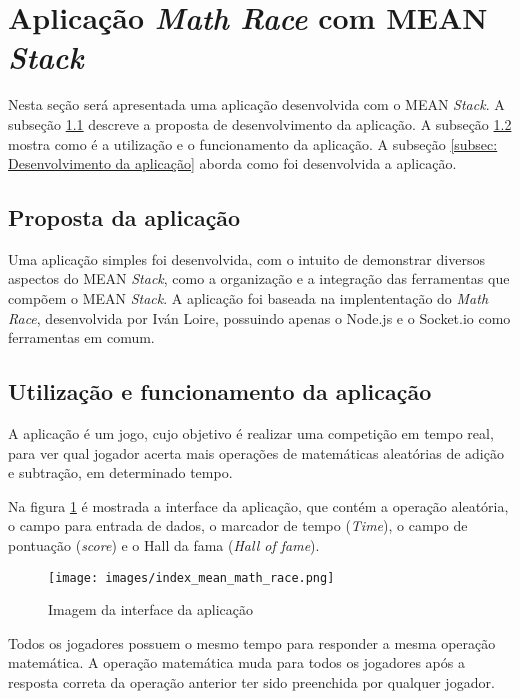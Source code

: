 \section{Aplicação \textit{Math Race} com MEAN \textit{Stack}}
\label{Aplicação Math Race com MEAN Stack}
Nesta seção será apresentada uma aplicação desenvolvida com o MEAN \textit{Stack}. A subseção \ref{subsec: Proposta de desenvolvimento} descreve a proposta de desenvolvimento da aplicação. A subseção \ref{subsec: Utilização e funcionamento da aplicação} mostra como é a utilização e o funcionamento da aplicação. A subseção \ref{subsec: Desenvolvimento da aplicação} aborda como foi desenvolvida a aplicação. 

\subsection{Proposta da aplicação}
\label{subsec: Proposta de desenvolvimento}
 Uma aplicação simples foi desenvolvida, com o intuito de demonstrar diversos aspectos do MEAN \textit{Stack}, como a organização e a integração das ferramentas que compõem o MEAN \textit{Stack}. A aplicação foi baseada na implententação do \textit{Math Race}, desenvolvida por Iván Loire\cite{MathRace}, possuindo apenas o Node.js e o Socket.io como ferramentas em comum.

\subsection{Utilização e funcionamento da aplicação}
\label{subsec: Utilização e funcionamento da aplicação}
 A aplicação é um jogo, cujo objetivo é realizar uma competição em tempo real, para ver qual jogador acerta mais operações de matemáticas aleatórias de adição e subtração, em determinado tempo.

Na figura \ref{fig:Imagem da interface da aplicação} é mostrada a interface da aplicação, que contém a operação aleatória, o campo para entrada de dados, o marcador de tempo (\textit{Time}), o campo de pontuação (\textit{score}) e o Hall da fama (\textit{Hall of fame}).

    \begin{figure}[htb]
    \centering
    \texttt{[image: images/index\_mean\_math\_race.png]}
    \caption{Imagem da interface da aplicação}
    \label{fig:Imagem da interface da aplicação}
    \end{figure}
    
Todos os jogadores possuem o mesmo tempo para responder a mesma operação matemática. A operação matemática muda para todos os jogadores após a resposta correta da operação anterior ter sido preenchida por qualquer jogador.

